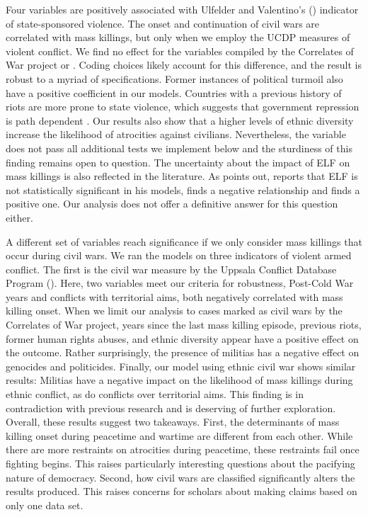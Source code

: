 Four variables are positively associated with Ulfelder and Valentino's (\citeyear{ulfelder2008assessing}) indicator of state-sponsored violence. The onset and continuation of civil wars are correlated with mass killings, but only when we employ the UCDP measures of violent conflict. We find no effect for the variables compiled by the Correlates of War project or \cite{cederman2010ethnic}. Coding choices likely account for this difference, and the result is robust to a myriad of specifications. Former instances of political turmoil also have a positive coefficient in our models. Countries with a previous history of riots are more prone to state violence, which suggests that government repression is path dependent 
\citep[e.g.,][]{gurr2000peoples,harff2003no,krain1997state,nyseth2017re}. Our results also show that a higher levels of ethnic diversity increase the likelihood of atrocities against civilians. Nevertheless, the variable does not pass all additional tests we implement below and the sturdiness of this finding remains open to question. The uncertainty about the impact of ELF on mass killings is also reflected in the literature. As \citet[237]{hoeffler2016development} points out, \citet{rummel1995democracy} reports that ELF is not statistically significant in his models, \citet{wood2014opportunities} finds a negative relationship and \citet{querido2009state} finds a positive one. Our analysis does not offer a definitive answer for this question either.

A different set of variables reach significance if we only consider mass killings that occur during civil wars. We ran the models on three indicators of violent armed conflict. The first is the civil war measure by the Uppsala Conflict Database Program  (\citeyear{allansson2017organized,gleditsch2002armed}). Here, two variables meet our criteria for robustness, Post-Cold War years and conflicts with territorial aims, both negatively correlated with mass killing onset. When we limit our analysis to cases marked as civil wars by the Correlates of War project, years since the last mass killing episode, previous riots, former human rights abuses, and ethnic diversity appear have a positive effect on the outcome. Rather surprisingly, the presence of militias has a negative effect on genocides and politicides. Finally, our model using ethnic civil war shows similar results: Militias have a negative impact on the likelihood of mass killings during ethnic conflict, as do conflicts over territorial aims. This finding is in contradiction with previous research \citep{koren2017means} and is deserving of further exploration. Overall, these results suggest two takeaways. First, the determinants of mass killing onset during peacetime and wartime are different from each other. While there are more restraints on atrocities during peacetime, these restraints fail once fighting begins. This raises particularly interesting questions about the pacifying nature of democracy. Second, how civil wars are classified significantly alters the results produced. This raises concerns for scholars about making claims based on only one data set.


